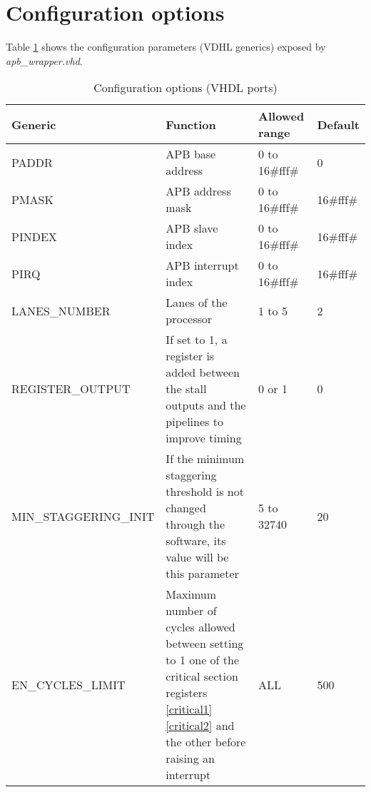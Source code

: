 \section{Configuration options}
\label{confg_chap}
Table \ref{generics} shows the configuration parameters (VDHL generics) exposed by \textit{apb\_wrapper.vhd}. 
\\
\begin{table}[H]
	\caption{Configuration options (VHDL ports)}
	\label{generics}
	\centering
	\begin{small}
		\begin{tabular}{|l|p{6cm}|l|l|}
			\hline
			\textbf{Generic} & \textbf{Function}  & \textbf{Allowed range}  & \textbf{Default}\\
			\hline
			PADDR  & APB base address &0 to 16\#fff\# & 0\\
			\hline
			PMASK  & APB address mask &0 to 16\#fff\# & 16\#fff\#\\
			\hline
			PINDEX & APB slave index &0 to 16\#fff\# & 16\#fff\#\\
			\hline
			PIRQ   & APB interrupt index &0 to 16\#fff\# & 16\#fff\#\\
			\hline
			LANES\_NUMBER & Lanes of the processor & 1 to 5 & 2\\
			\hline
			REGISTER\_OUTPUT & If set to 1, a register is added between the stall outputs and the pipelines to improve timing & 0 or 1 & 0 \\
			\hline
			MIN\_STAGGERING\_INIT & If the minimum staggering threshold is not changed through the software, its value will be this parameter& 5 to 32740 & 20 \\
			\hline
                        EN\_CYCLES\_LIMIT & Maximum number of cycles allowed between setting to 1 one of the critical section registers \ref{critical1} \ref{critical2} and the other before raising an interrupt & ALL & 500 \\
			\hline
		\end{tabular}
	\end{small}
\end{table}

\hspace{2cm}
